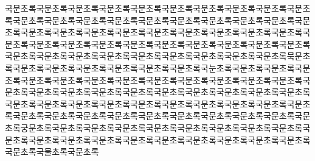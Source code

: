국문초록국문초록국문초록국문초록국문초록국문초록국문초록국문초록국문초록국문초록국문초록국문초록국문초록국문초록국문초록국문초록국문초록국문초록국문초록국문초록국문초록국문초록국문초록국문초록국문초록국문초록국문초록국문초록국문초록국문초록국문초록국문초록국문초록국문초록국문초록국문초록국문초록국문초록국문초록국문초록국문초록국문초록국문초록국문초록국문초록국문초록국문초록국문초록묵문초록국문초록국문초록국문초록국문초록국문초록국문초록국눈초록국문초록국문초록국문초록국문초록국문초록국문초록국문초록국문초록국문초록국문초록국문초록국문초록국문초록국문초록국문초록국문초록국문초록국문초록국문초록국문초록국문초록국문초록국문초록국문초록국문초록국문초록국문초록국문초록국문초록국문초록국문초록국문초록국문초록국문초록국문초록국문초록국문초록국문초록국문초록국문초록국문초록국문초록궁문초록국문초록국문초록국문초록국문초록국문초록국문초록국문초록국문초록국문초록국문초록국문초록국문초록국문초록국문초록국문초록국문초록국문초록국문초록국문초록국물초록국문초록
